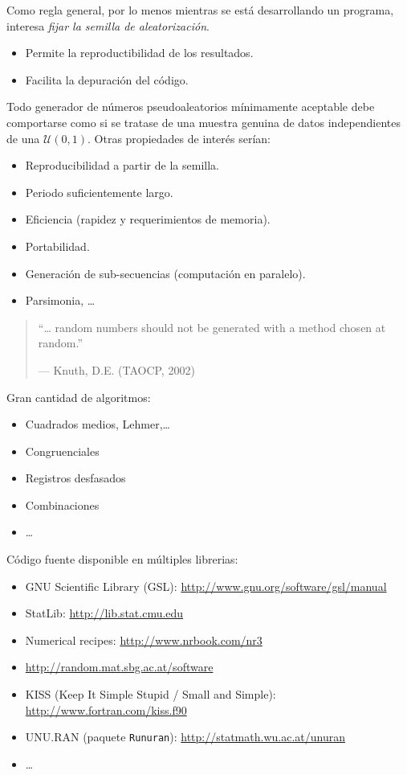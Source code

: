 \documentclass[
]{book}
\theoremstyle{break}
\theoremstyle{definition}
\theoremstyle{definition}
\theoremstyle{definition}
\theoremstyle{remark}
\begin{document}
Como regla general, por lo menos mientras se está desarrollando un
programa, interesa \emph{fijar la semilla de aleatorización}.

\begin{itemize}
\item
  Permite la reproductibilidad de los resultados.
\item
  Facilita la depuración del código.
\end{itemize}

Todo generador de números pseudoaleatorios mínimamente aceptable
debe comportarse como si se tratase de una muestra genuina de datos
independientes de una \(\mathcal{U}(0,1)\).
Otras propiedades de interés serían:

\begin{itemize}
\item
  Reproducibilidad a partir de la semilla.
\item
  Periodo suficientemente largo.
\item
  Eficiencia (rapidez y requerimientos de memoria).
\item
  Portabilidad.
\item
  Generación de sub-secuencias (computación en paralelo).
\item
  Parsimonia, \ldots{}
\end{itemize}

\begin{quote}
``\ldots{} random numbers should not be generated with a method chosen at random.''

--- Knuth, D.E. (TAOCP, 2002)
\end{quote}

Gran cantidad de algoritmos:

\begin{itemize}
\item
  Cuadrados medios, Lehmer,\ldots{}
\item
  Congruenciales
\item
  Registros desfasados
\item
  Combinaciones
\item
  \ldots{}
\end{itemize}

Código fuente disponible en múltiples librerias:

\begin{itemize}
\item
  GNU Scientific Library (GSL):
  \href{http://www.gnu.org/software/gsl/manual/html_node/Random-Number-Generation.html}{http://www.gnu.org/software/gsl/manual}
\item
  StatLib: \url{http://lib.stat.cmu.edu}
\item
  Numerical recipes: \url{http://www.nrbook.com/nr3}
\item
  \url{http://random.mat.sbg.ac.at/software}
\item
  KISS (Keep It Simple Stupid / Small and Simple):
  \url{http://www.fortran.com/kiss.f90}
\item
  UNU.RAN (paquete \texttt{Runuran}):
  \url{http://statmath.wu.ac.at/unuran}
\item
  \ldots{}
\end{itemize}
\end{document}
